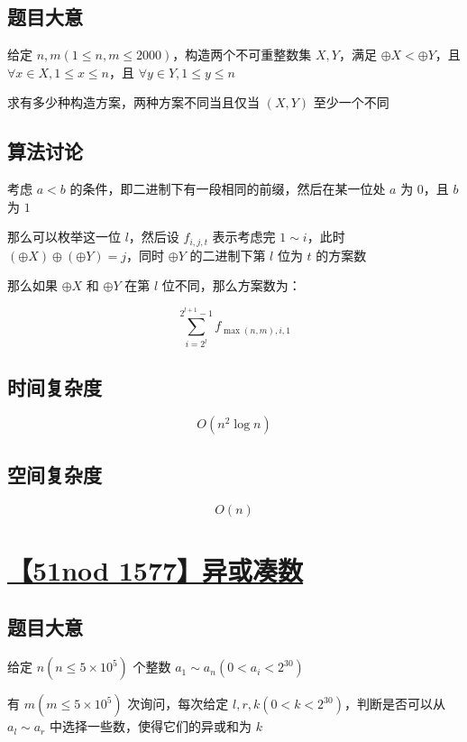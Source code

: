 \documentclass[UTF8]{article}
\begin{document}
\subsection{题目大意}

给定 $n,m(1 \le n,m \le 2000)$，构造两个不可重整数集 $X,Y$，满足 $\oplus X < \oplus Y$，且 $\forall x \in X,1 \le x \le n$，且 $\forall y \in Y,1 \le y \le n$

求有多少种构造方案，两种方案不同当且仅当 $(X,Y)$ 至少一个不同

\subsection{算法讨论}

考虑 $a<b$ 的条件，即二进制下有一段相同的前缀，然后在某一位处 $a$ 为 $0$，且 $b$ 为 $1$

那么可以枚举这一位 $l$，然后设 $f_{i, j, t}$ 表示考虑完 $1 \sim i$，此时 $(\oplus X) \oplus (\oplus Y)=j$，同时 $\oplus Y$ 的二进制下第 $l$ 位为 $t$ 的方案数

那么如果 $\oplus X$ 和 $\oplus Y$ 在第 $l$ 位不同，那么方案数为：

$$
\sum_{i=2^l}^{2^{l+1}-1}f_{\max(n,m), i, 1}
$$

\subsection{时间复杂度}

$$
O(n^2 \log n)
$$

\subsection{空间复杂度}

$$
O(n)
$$

\section{\href{http://www.51nod.com/Challenge/Problem.html?problemId=1577}{【51nod 1577】异或凑数}}

\subsection{题目大意}

给定 $n(n \le 5 \times 10^5)$ 个整数 $a_1 \sim a_n(0 < a_i < 2^{30})$

有 $m(m \le 5 \times 10^5)$ 次询问，每次给定 $l, r, k(0 < k < 2^{30})$，判断是否可以从 $a_l \sim a_r$ 中选择一些数，使得它们的异或和为 $k$
\end{document}

